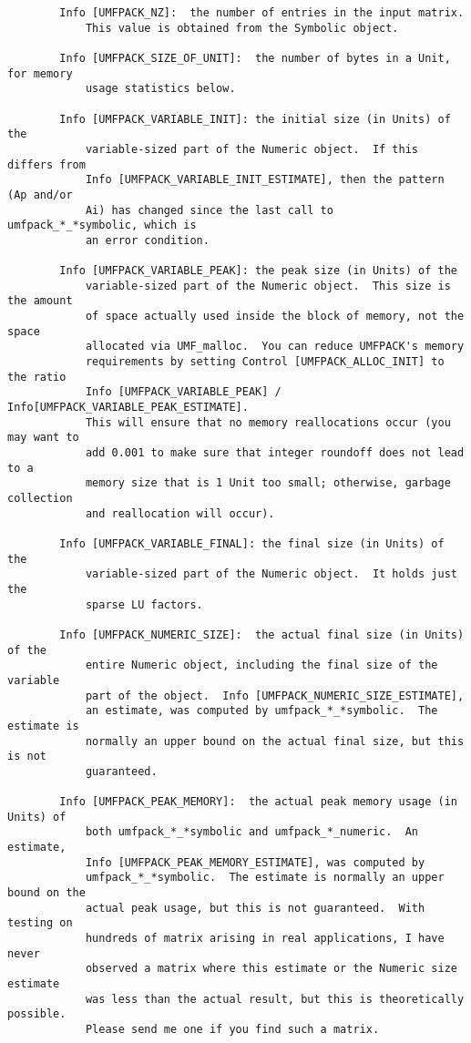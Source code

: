 {\begin{verbatim}
        Info [UMFPACK_NZ]:  the number of entries in the input matrix.
            This value is obtained from the Symbolic object.

        Info [UMFPACK_SIZE_OF_UNIT]:  the number of bytes in a Unit, for memory
            usage statistics below.

        Info [UMFPACK_VARIABLE_INIT]: the initial size (in Units) of the
            variable-sized part of the Numeric object.  If this differs from
            Info [UMFPACK_VARIABLE_INIT_ESTIMATE], then the pattern (Ap and/or
            Ai) has changed since the last call to umfpack_*_*symbolic, which is
            an error condition.

        Info [UMFPACK_VARIABLE_PEAK]: the peak size (in Units) of the
            variable-sized part of the Numeric object.  This size is the amount
            of space actually used inside the block of memory, not the space
            allocated via UMF_malloc.  You can reduce UMFPACK's memory
            requirements by setting Control [UMFPACK_ALLOC_INIT] to the ratio
            Info [UMFPACK_VARIABLE_PEAK] / Info[UMFPACK_VARIABLE_PEAK_ESTIMATE].
            This will ensure that no memory reallocations occur (you may want to
            add 0.001 to make sure that integer roundoff does not lead to a
            memory size that is 1 Unit too small; otherwise, garbage collection
            and reallocation will occur).

        Info [UMFPACK_VARIABLE_FINAL]: the final size (in Units) of the
            variable-sized part of the Numeric object.  It holds just the
            sparse LU factors.

        Info [UMFPACK_NUMERIC_SIZE]:  the actual final size (in Units) of the
            entire Numeric object, including the final size of the variable
            part of the object.  Info [UMFPACK_NUMERIC_SIZE_ESTIMATE],
            an estimate, was computed by umfpack_*_*symbolic.  The estimate is
            normally an upper bound on the actual final size, but this is not
            guaranteed.

        Info [UMFPACK_PEAK_MEMORY]:  the actual peak memory usage (in Units) of
            both umfpack_*_*symbolic and umfpack_*_numeric.  An estimate,
            Info [UMFPACK_PEAK_MEMORY_ESTIMATE], was computed by
            umfpack_*_*symbolic.  The estimate is normally an upper bound on the
            actual peak usage, but this is not guaranteed.  With testing on
            hundreds of matrix arising in real applications, I have never
            observed a matrix where this estimate or the Numeric size estimate
            was less than the actual result, but this is theoretically possible.
            Please send me one if you find such a matrix.


\end{verbatim}}

